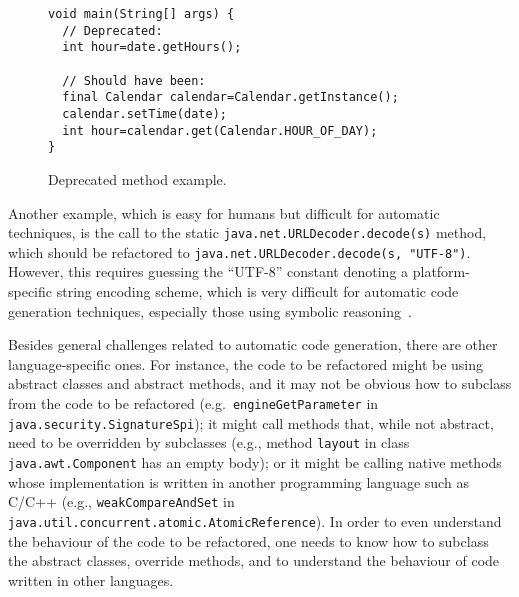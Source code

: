 \documentclass[sigconf,review,anonymous]{acmart}
\begin{document}
\begin{figure}[ht]
\begin{lstlisting}[mathescape=true,showstringspaces=false]
void main(String[] args) {
  // Deprecated:
  int hour=date.getHours();
  
  // Should have been:
  final Calendar calendar=Calendar.getInstance();
  calendar.setTime(date);
  int hour=calendar.get(Calendar.HOUR_OF_DAY);
}
\end{lstlisting}
\caption{Deprecated method example.}
\label{ex:deprecated-method-other}
\end{figure}

Another example, which is easy for humans but difficult for automatic techniques, is the call to the static \lstinline[breaklines=true]{java.net.URLDecoder.decode(s)} method, which should be refactored to \lstinline[breaklines=true]{java.net.URLDecoder.decode(s, "UTF-8")}.
However, this requires guessing the ``UTF-8'' constant denoting a platform-specific
string encoding scheme, which is very difficult for automatic code generation techniques, especially those using symbolic reasoning~\cite{DBLP:conf/cav/AbateDKKP18}.


Besides general challenges related to automatic code generation, there are other language-specific ones. For instance, the code to be refactored might be using abstract classes and abstract methods, and it may not be obvious how to subclass from the code to be refactored (e.g.~\lstinline[breaklines=true]{engineGetParameter} in \lstinline[breaklines=true]{java.security.SignatureSpi}); it might call methods that, while not abstract, need to be overridden by subclasses (e.g., method \lstinline[breaklines=true]{layout} in class \lstinline[breaklines=true]{java.awt.Component} has an empty body); or it might be calling native methods whose implementation is written in another programming language such as C/C++ (e.g., \lstinline[breaklines=true]{weakCompareAndSet} in \lstinline[breaklines=true]{java.util.concurrent.atomic.AtomicReference}). In order to even understand the behaviour of the code to be refactored, one needs to know how to subclass the abstract classes, override methods, and to understand the behaviour of code written in other languages.
\end{document}
